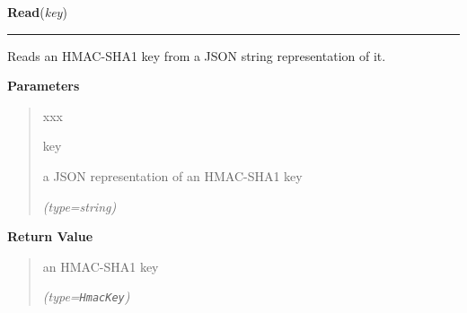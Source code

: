     \label{keyczar:keys:HmacKey:Read}

    \vspace{0.5ex}

\hspace{.8\funcindent}\begin{boxedminipage}{\funcwidth}

    \raggedright \textbf{Read}(\textit{key})

    \vspace{-1.5ex}

    \rule{\textwidth}{0.5\fboxrule}
\setlength{\parskip}{2ex}
    Reads an HMAC-SHA1 key from a JSON string representation of it.

\setlength{\parskip}{1ex}
      \textbf{Parameters}
      \vspace{-1ex}

      \begin{quote}
        \begin{Ventry}{xxx}

          \item[key]

          a JSON representation of an HMAC-SHA1 key

            {\it (type=string)}

        \end{Ventry}

      \end{quote}

      \textbf{Return Value}
    \vspace{-1ex}

      \begin{quote}
      an HMAC-SHA1 key

      {\it (type=\texttt{HmacKey})}

      \end{quote}

    \end{boxedminipage}

    \label{keyczar:keys:HmacKey:Sign}

    \vspace{0.5ex}

